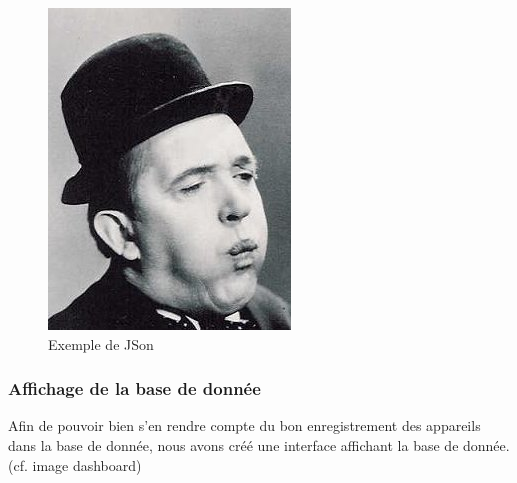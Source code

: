 \documentclass[twocolumn,a4paper]{IEEEtranfr}
\begin{document}
\begin{figure}[htpb]
  \begin{center}
    \includegraphics[width=0.7\columnwidth] {../images/SLaurel.jpg}
  \end{center}
  \caption{Exemple de JSon }
  \label{fig:gouts}
\end{figure}

\subsubsection{Affichage de la base de donnée}

Afin de pouvoir bien s’en rendre compte du bon enregistrement des appareils dans la base de donnée, nous avons créé une interface affichant la base de donnée. (cf. image dashboard)
\end{document}

